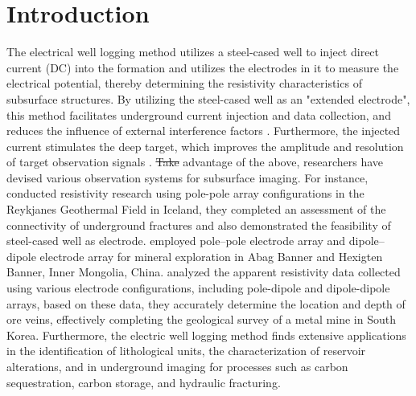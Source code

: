\documentclass[manuscript,blind]{geophysics}
\providecommand{\DIFadd}[1]{{\protect\color{blue}\uwave{#1}}} %
\providecommand{\DIFdel}[1]{{\protect\color{red}\sout{#1}}}                      %
\providecommand{\DIFaddbegin}{} %
\providecommand{\DIFaddend}{} %
\providecommand{\DIFdelbegin}{} %
\providecommand{\DIFdelend}{} %
\newcommand{\DIFscaledelfig}{0.5}
\newlength{\DIFdelgraphicswidth} %
\newlength{\DIFdelgraphicsheight} %
\newcommand{\DIFaddincludegraphics}[2][]{{\color{blue}\fbox{\DIFOincludegraphics[#1]{#2}}}} %
\newcommand{\DIFdelincludegraphics}[2][]{%
\sbox{\DIFdelgraphicsbox}{\DIFOincludegraphics[#1]{#2}}%
\settoboxwidth{\DIFdelgraphicswidth}{\DIFdelgraphicsbox} %
\settoboxtotalheight{\DIFdelgraphicsheight}{\DIFdelgraphicsbox} %
\scalebox{\DIFscaledelfig}{%
\parbox[b]{\DIFdelgraphicswidth}{\usebox{\DIFdelgraphicsbox}\\[-\baselineskip] \rule{\DIFdelgraphicswidth}{0em}}\llap{\resizebox{\DIFdelgraphicswidth}{\DIFdelgraphicsheight}{%
\setlength{\unitlength}{\DIFdelgraphicswidth}%
\begin{picture}(1,1)%
\thicklines\linethickness{2pt} %
{\color[rgb]{1,0,0}\put(0,0){\framebox(1,1){}}}%
{\color[rgb]{1,0,0}\put(0,0){\line( 1,1){1}}}%
{\color[rgb]{1,0,0}\put(0,1){\line(1,-1){1}}}%
\end{picture}%
}\hspace*{3pt}}} %
} %
\DeclareRobustCommand{\DIFaddbegin}{\DIFOaddbegin \let\includegraphics\DIFaddincludegraphics} %
\DeclareRobustCommand{\DIFaddend}{\DIFOaddend \let\includegraphics\DIFOincludegraphics} %
\DeclareRobustCommand{\DIFdelbegin}{\DIFOdelbegin \let\includegraphics\DIFdelincludegraphics} %
\DeclareRobustCommand{\DIFdelend}{\DIFOaddend \let\includegraphics\DIFOincludegraphics} %
\begin{document}
\section{Introduction}

The electrical well logging method utilizes a steel-cased well to inject direct current (DC) into the formation and utilizes the electrodes in it to measure the electrical potential, thereby determining the resistivity characteristics of subsurface structures. By utilizing the steel-cased well as an "extended electrode", this method facilitates underground current injection and data collection, and reduces the influence of external interference factors \citep{rucker2010electrical,ronczka2015numerical,yang20163d}. Furthermore, the injected current stimulates the deep target, which improves the amplitude and resolution of target observation signals \citep{schenkel1994electrical,weiss2016direct,hoversten2017borehole}. \DIFdelbegin \DIFdel{Take }\DIFdelend \DIFaddbegin \DIFadd{Taking }\DIFaddend advantage of the above, researchers have devised various observation systems for subsurface imaging. For instance, \cite{magnusdottir2020casing} conducted resistivity research using pole-pole array configurations in the Reykjanes Geothermal Field in Iceland, they completed an assessment of the connectivity of underground fractures and also demonstrated the feasibility of steel-cased well as electrode. \cite{zhang2017out} employed pole–pole electrode array and dipole–dipole electrode array for mineral exploration in Abag Banner and Hexigten Banner, Inner Mongolia, China. \cite{park2009electrical} analyzed the apparent resistivity data collected using various electrode configurations, including pole-dipole and dipole-dipole arrays, based on these data, they accurately determine the location and depth of ore veins, effectively completing the geological survey of a metal mine in South Korea. Furthermore, the electric well logging method finds extensive applications in the identification of lithological units, the characterization of reservoir alterations, and in underground imaging for processes such as carbon sequestration, carbon storage, and hydraulic fracturing.
\end{document}
